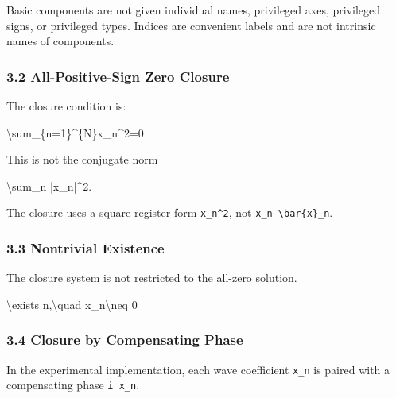 \documentclass[
  a4paper,
]{article}
\newenvironment{Shaded}{}{}
\newcommand{\NormalTok}[1]{#1}
\begin{document}
Basic components are not given individual names, privileged axes,
privileged signs, or privileged types. Indices are convenient labels and
are not intrinsic names of components.

\subsubsection{3.2 All-Positive-Sign Zero
Closure}\label{all-positive-sign-zero-closure}

The closure condition is:

\begin{Shaded}
\begin{Highlighting}[]
\NormalTok{\textbackslash{}sum\_\{n=1\}\^{}\{N\}x\_n\^{}2=0}
\end{Highlighting}
\end{Shaded}

This is not the conjugate norm

\begin{Shaded}
\begin{Highlighting}[]
\NormalTok{\textbackslash{}sum\_n |x\_n|\^{}2.}
\end{Highlighting}
\end{Shaded}

The closure uses a square-register form \texttt{x\_n\^{}2}, not
\texttt{x\_n\ \textbackslash{}bar\{x\}\_n}.

\subsubsection{3.3 Nontrivial Existence}\label{nontrivial-existence}

The closure system is not restricted to the all-zero solution.

\begin{Shaded}
\begin{Highlighting}[]
\NormalTok{\textbackslash{}exists n,\textbackslash{}quad x\_n\textbackslash{}neq 0}
\end{Highlighting}
\end{Shaded}

\subsubsection{3.4 Closure by Compensating
Phase}\label{closure-by-compensating-phase}

In the experimental implementation, each wave coefficient \texttt{x\_n}
is paired with a compensating phase \texttt{i\ x\_n}.
\end{document}
